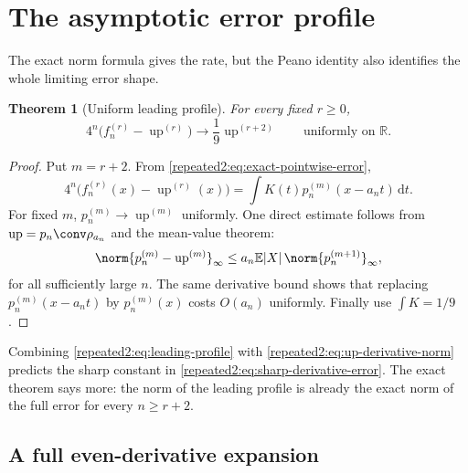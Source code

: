 \documentclass[11pt,oneside]{article}
\newtheorem{theorem}{Theorem}[section]
\theoremstyle{definition}
\theoremstyle{remark}
\newcommand{\R}{\mathbb R}
\newcommand{\Up}{\operatorname{up}}
\newcommand{\dd}{\,\mathrm d}
\newcommand{\E}{\mathbb E}
\begin{document}
\section{The asymptotic error profile}
\label{repeated2:sec:asymptotic-profile}

The exact norm formula gives the rate, but the Peano identity also identifies the whole
limiting error shape.

\begin{theorem}[Uniform leading profile]
\label{repeated2:thm:leading-profile}
For every fixed $r\ge0$,
\begin{equation}
 4^n\bigl(f_n^{(r)}-\Up^{(r)}\bigr)
 \longrightarrow \frac19\Up^{(r+2)}
 \qquad\text{uniformly on }\R.
 \label{repeated2:eq:leading-profile}
\end{equation}
\end{theorem}

\begin{proof}
Put $m=r+2$.  From \eqref{repeated2:eq:exact-pointwise-error},
\[
 4^n\bigl(f_n^{(r)}(x)-\Up^{(r)}(x)\bigr)
 =\int K(t)p_n^{(m)}(x-a_nt)\dd t.
\]
For fixed $m$, $p_n^{(m)}\to\Up^{(m)}$ uniformly.  One direct estimate follows from
$\Up=p_n\conv\rho_{a_n}$ and the mean-value theorem:
\[
 \norm{p_n^{(m)}-\Up^{(m)}}_\infty
 \le a_n\E|X|\,\norm{p_n^{(m+1)}}_\infty,
\]
for all sufficiently large $n$.  The same derivative bound shows that replacing
$p_n^{(m)}(x-a_nt)$ by $p_n^{(m)}(x)$ costs $O(a_n)$ uniformly.  Finally use
$\int K=1/9$.
\end{proof}

Combining \eqref{repeated2:eq:leading-profile} with \eqref{repeated2:eq:up-derivative-norm} predicts the sharp
constant in \eqref{repeated2:eq:sharp-derivative-error}.  The exact theorem says more: the norm of the
leading profile is already the exact norm of the full error for every $n\ge r+2$.

\subsection{A full even-derivative expansion}
\end{document}
